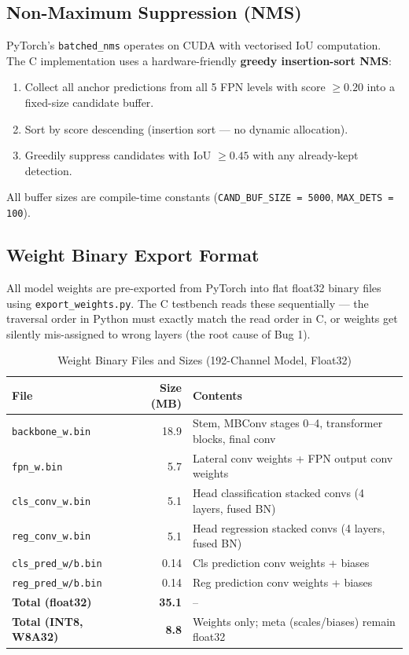 \subsection{Non-Maximum Suppression (NMS)}

PyTorch's \texttt{batched\_nms} operates on CUDA with vectorised IoU computation. The C implementation uses a hardware-friendly \textbf{greedy insertion-sort NMS}:
\begin{enumerate}
    \item Collect all anchor predictions from all 5 FPN levels with score $\geq 0.20$ into a fixed-size candidate buffer.
    \item Sort by score descending (insertion sort — no dynamic allocation).
    \item Greedily suppress candidates with IoU $\geq 0.45$ with any already-kept detection.
\end{enumerate}
All buffer sizes are compile-time constants (\texttt{CAND\_BUF\_SIZE = 5000}, \texttt{MAX\_DETS = 100}).

\subsection{Weight Binary Export Format}

All model weights are pre-exported from PyTorch into flat float32 binary files using \texttt{export\_weights.py}. The C testbench reads these sequentially — the traversal order in Python must exactly match the read order in C, or weights get silently mis-assigned to wrong layers (the root cause of Bug 1).

\begin{table}[H]
\centering
\caption{Weight Binary Files and Sizes (192-Channel Model, Float32)}
\begin{tabular}{|l|r|l|}
\hline
\textbf{File} & \textbf{Size (MB)} & \textbf{Contents} \\
\hline
\texttt{backbone\_w.bin} & 18.9 & Stem, MBConv stages 0--4, transformer blocks, final conv \\
\texttt{fpn\_w.bin}      &  5.7 & Lateral conv weights + FPN output conv weights \\
\texttt{cls\_conv\_w.bin}&  5.1 & Head classification stacked convs (4 layers, fused BN) \\
\texttt{reg\_conv\_w.bin}&  5.1 & Head regression stacked convs (4 layers, fused BN) \\
\texttt{cls\_pred\_w/b.bin} & 0.14 & Cls prediction conv weights + biases \\
\texttt{reg\_pred\_w/b.bin} & 0.14 & Reg prediction conv weights + biases \\
\hline
\textbf{Total (float32)} & \textbf{35.1} & -- \\
\textbf{Total (INT8, W8A32)} & \textbf{8.8} & Weights only; meta (scales/biases) remain float32 \\
\hline
\end{tabular}
\label{table:weight_bins}
\end{table}

